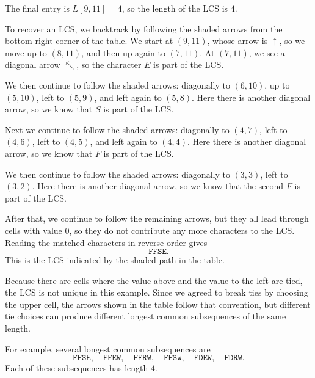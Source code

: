\documentclass{brockcosc3p03}
\begin{document}
The final entry is $L[9,11]=4$, so the length of the LCS is $4$.

To recover an LCS, we backtrack by following the shaded arrows from the bottom-right corner of the table. We start at $(9,11)$, whose arrow is $\uparrow$, so we move up to $(8,11)$, and then up again to $(7,11)$. At $(7,11)$, we see a diagonal arrow $\nwarrow$, so the character $E$ is part of the LCS.

We then continue to follow the shaded arrows: diagonally to $(6,10)$, up to $(5,10)$, left to $(5,9)$, and left again to $(5,8)$. Here there is another diagonal arrow, so we know that $S$ is part of the LCS.

Next we continue to follow the shaded arrows: diagonally to $(4,7)$, left to $(4,6)$, left to $(4,5)$, and left again to $(4,4)$. Here there is another diagonal arrow, so we know that $F$ is part of the LCS.

We then continue to follow the shaded arrows: diagonally to $(3,3)$, left to $(3,2)$. Here there is another diagonal arrow, so we know that the second $F$ is part of the LCS.

After that, we continue to follow the remaining arrows, but they all lead through cells with value $0$, so they do not contribute any more characters to the LCS. Reading the matched characters in reverse order gives
\[
\texttt{FFSE}.
\]
This is the LCS indicated by the shaded path in the table.

Because there are cells where the value above and the value to the left are tied, the LCS is not unique in this example. Since we agreed to break ties by choosing the upper cell, the arrows shown in the table follow that convention, but different tie choices can produce different longest common subsequences of the same length.

For example, several longest common subsequences are
\[
\texttt{FFSE},\quad \texttt{FFEW},\quad \texttt{FFRW},\quad \texttt{FFSW},\quad \texttt{FDEW},\quad \texttt{FDRW}.
\]
Each of these subsequences has length $4$.

\newpage


\end{document}
